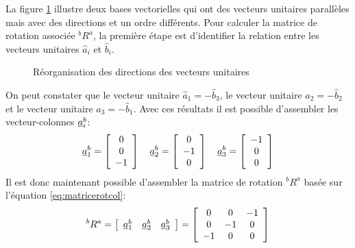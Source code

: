 \begin{example}
%
La figure \ref{fig:r_reorg} illustre deux bases vectorielles qui ont des vecteurs unitaires parallèles mais avec des directions et un ordre différents. Pour calculer la matrice de rotation associée $^bR^a$, la première étape est d'identifier la relation entre les vecteurs unitaires $\hat{a}_i$ et $\hat{b}_i$. 
%
\begin{figure}[H]
        \centering
				\hspace{20pt}
				\hspace{20pt}
        \caption{Réorganisation des directions des vecteurs unitaires}
				\label{fig:r_reorg}
\end{figure}
%
On peut constater que le vecteur unitaire $\hat{a}_1=-\hat{b}_3$, le vecteur unitaire $\hat{a}_2=-\hat{b}_2$ et le vecteur unitaire $\hat{a}_3=-\hat{b}_1$. Avec ces résultats il est possible d'assembler les vecteur-colonnes $\underline{a}_i^b$:
\begin{align}
\underline{a}_1^b = \left[ \begin{array}{c} 0 \\ 0 \\ -1  \end{array} \right] \quad
\underline{a}_2^b = \left[ \begin{array}{c} 0 \\ -1 \\ 0 \end{array} \right] \quad
\underline{a}_3^b = \left[ \begin{array}{c} -1 \\ 0 \\ 0   \end{array} \right]
\end{align}
Il est donc maintenant possible d'assembler la matrice de rotation $^bR^a$ basée sur l'équation \eqref{eq:matricerotcol}:
\begin{align}
^bR^a =\left[ \begin{array}{c c c}
	\underline{a}_1^b  & \underline{a}_2^b & \underline{a}_3^b
\end{array}  \right]
= \left[ \begin{array}{c c c}
	0 & 0 & -1 \\
	0 & -1 & 0 \\
-1 & 0 & 0 
\end{array}  \right]
\end{align}
\end{example}



